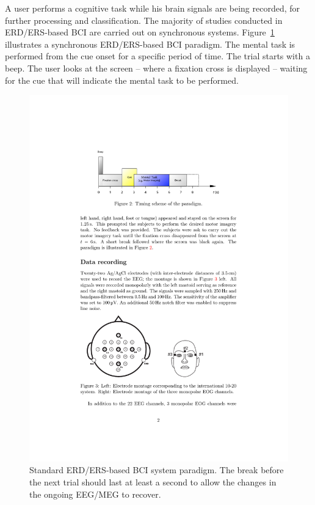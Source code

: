 A user performs a cognitive task while his brain signals are being recorded, for further processing and classification.
The majority of studies conducted in ERD/ERS-based BCI are carried out on synchronous systems. 
Figure~\ref{fig:ERDSparadigm} illustrates a synchronous ERD/ERS-based BCI paradigm. 
The mental task is performed from the cue onset for a specific period of time. The trial starts with a beep. The user looks at the screen -- where a fixation cross is displayed -- waiting for the cue that will indicate the mental task to be performed. 
\begin{figure}[!ht]
    \centering
    \includegraphics[width=0.5\columnwidth]{Figures/ERDS-paradigm.pdf}
    \caption{\footnotesize{Standard ERD/ERS-based BCI system paradigm. The
    break before the next trial should last at least a second to allow the changes in the
    ongoing EEG/MEG to recover. }}
    \label{fig:ERDSparadigm}
\end{figure}
\par

